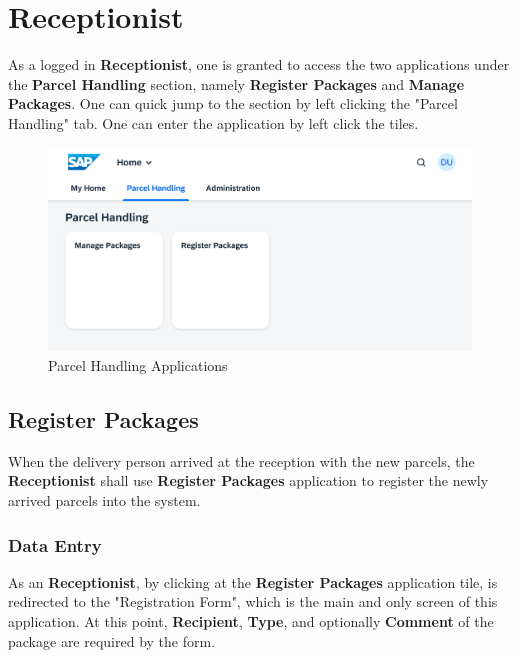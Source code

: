 \pagebreak

\section{Receptionist}

As a logged in \textbf{Receptionist}, one is granted to access the two applications under the \textbf{Parcel Handling} section, namely \textbf{Register Packages} and \textbf{Manage Packages}. One can quick jump to the section by left clicking the "Parcel Handling" tab. One can enter the application by left click the tiles.

\begin{figure}[H]
	\centering
	\includegraphics[width=1\linewidth]{images/user_doc/overviews/ParcelHandlingTab.png}
	\caption{Parcel Handling Applications}
	\label{fig:PHApplications}
\end{figure}


\subsection{Register Packages}

When the delivery person arrived at the reception with the new parcels, the \textbf{Receptionist} shall use \textbf{Register Packages} application to register the newly arrived parcels into the system. 

\subsubsection{Data Entry}

As an \textbf{Receptionist}, by clicking at the \textbf{Register Packages} application tile, is redirected to the "Registration Form", which is the main and only screen of this application. At this point, \textbf{Recipient}, \textbf{Type}, \textbf{} and optionally \textbf{Comment} of the package are required by the form. 

